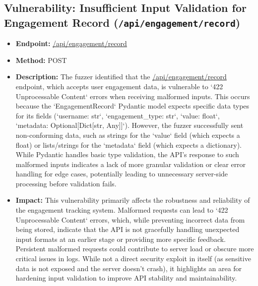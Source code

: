\documentclass{article}
\begin{document}
\subsection{\texorpdfstring{\textbf{Vulnerability: Insufficient Input Validation for Engagement Record (\texttt{/api/engagement/record})}}{Vulnerability: Insufficient Input Validation for Engagement Record (/api/engagement/record)}}
\begin{itemize}
    \item \textbf{Endpoint:} \url{/api/engagement/record}
    \item \textbf{Method:} POST
    \item \textbf{Description:}
    The fuzzer identified that the \url{/api/engagement/record} endpoint, which accepts user engagement data, is vulnerable to `422 Unprocessable Content` errors when receiving malformed inputs. This occurs because the `EngagementRecord` Pydantic model expects specific data types for its fields (`username: str`, `engagement_type: str`, `value: float`, `metadata: Optional[Dict[str, Any]]`). However, the fuzzer successfully sent non-conforming data, such as strings for the `value` field (which expects a float) or lists/strings for the `metadata` field (which expects a dictionary). While Pydantic handles basic type validation, the API's response to such malformed inputs indicates a lack of more granular validation or clear error handling for edge cases, potentially leading to unnecessary server-side processing before validation fails.
    \item \textbf{Impact:}
    This vulnerability primarily affects the robustness and reliability of the engagement tracking system. Malformed requests can lead to `422 Unprocessable Content` errors, which, while preventing incorrect data from being stored, indicate that the API is not gracefully handling unexpected input formats at an earlier stage or providing more specific feedback. Persistent malformed requests could contribute to server load or obscure more critical issues in logs. While not a direct security exploit in itself (as sensitive data is not exposed and the server doesn't crash), it highlights an area for hardening input validation to improve API stability and maintainability.
\end{itemize}
\end{document}
